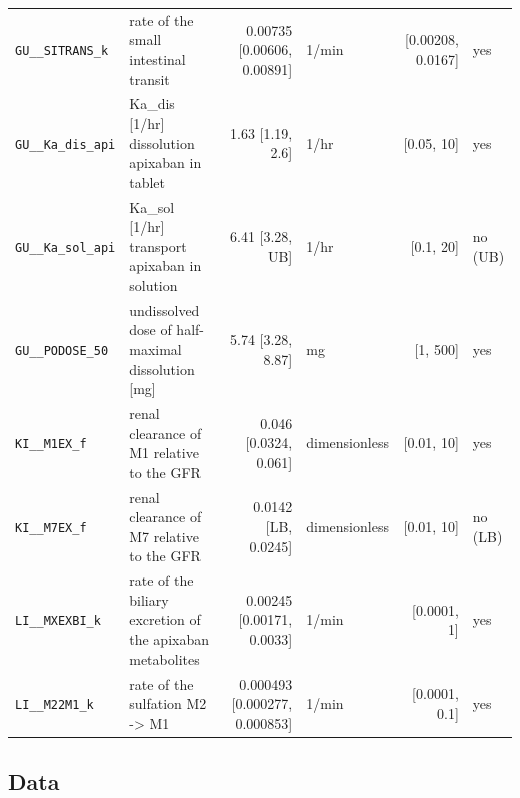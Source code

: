 \begin{longtable}{llrlrl}
\texttt{GU\_\_SITRANS\_k} & rate of the small intestinal transit & 0.00735 [0.00606, 0.00891] & 1/min & [0.00208, 0.0167] & yes \\
\texttt{GU\_\_Ka\_dis\_api} & Ka\_dis [1/hr] dissolution apixaban in tablet & 1.63 [1.19, 2.6] & 1/hr & [0.05, 10] & yes \\
\texttt{GU\_\_Ka\_sol\_api} & Ka\_sol [1/hr] transport apixaban in solution & 6.41 [3.28, UB] & 1/hr & [0.1, 20] & no (UB) \\
\texttt{GU\_\_PODOSE\_50} & undissolved dose of half-maximal dissolution [mg] & 5.74 [3.28, 8.87] & mg & [1, 500] & yes \\
\texttt{KI\_\_M1EX\_f} & renal clearance of M1 relative to the GFR & 0.046 [0.0324, 0.061] & dimensionless & [0.01, 10] & yes \\
\texttt{KI\_\_M7EX\_f} & renal clearance of M7 relative to the GFR & 0.0142 [LB, 0.0245] & dimensionless & [0.01, 10] & no (LB) \\
\texttt{LI\_\_MXEXBI\_k} & rate of the biliary excretion of the apixaban metabolites & 0.00245 [0.00171, 0.0033] & 1/min & [0.0001, 1] & yes \\
\texttt{LI\_\_M22M1\_k} & rate of the sulfation M2 -> M1 & 0.000493 [0.000277, 0.000853] & 1/min & [0.0001, 0.1] & yes \\
\end{longtable}

\subsection{Data}

